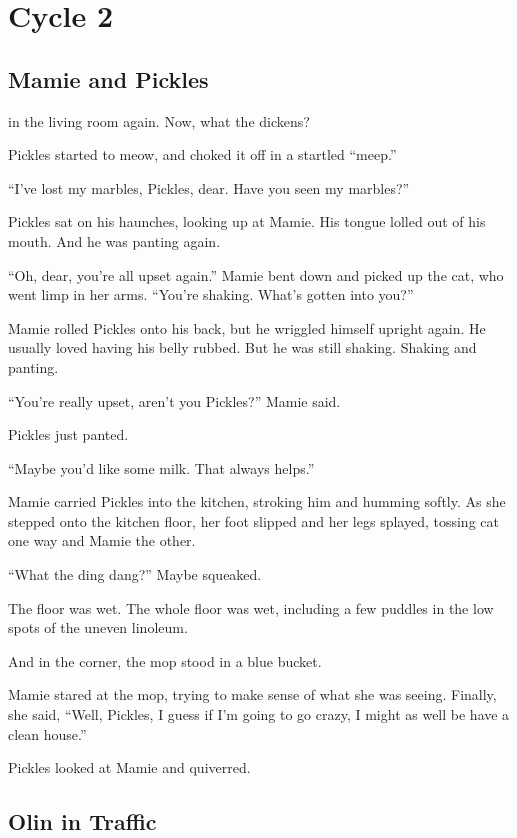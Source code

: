 \part{Cycle 2}

\chapter{Mamie and Pickles}

 in the living room again. Now, what the dickens?

Pickles started to meow, and choked it off in a startled “meep.”

“I’ve lost my marbles, Pickles, dear. Have you seen my marbles?”

Pickles sat on his haunches, looking up at Mamie. His tongue lolled out of his mouth. And he was panting again.

“Oh, dear, you’re all upset again.” Mamie bent down and picked up the cat, who went limp in her arms. “You’re shaking. What’s gotten into you?”

Mamie rolled Pickles onto his back, but he wriggled himself upright again. He usually loved having his belly rubbed. But he was still shaking. Shaking and panting.

“You’re really upset, aren’t you Pickles?” Mamie said.

Pickles just panted.

“Maybe you’d like some milk. That always helps.”

Mamie carried Pickles into the kitchen, stroking him and humming softly. As she stepped onto the kitchen floor, her foot slipped and her legs splayed, tossing cat one way and Mamie the other.

“What the ding dang?” Maybe squeaked.

The floor was wet. The whole floor was wet, including a few puddles in the low spots of the uneven linoleum.

And in the corner, the mop stood in a blue bucket.

Mamie stared at the mop, trying to make sense of what she was seeing. Finally, she said, “Well, Pickles, I guess if I’m going to go crazy, I might as well be have a clean house.”

Pickles looked at Mamie and quiverred.



\chapter{Olin in Traffic}

